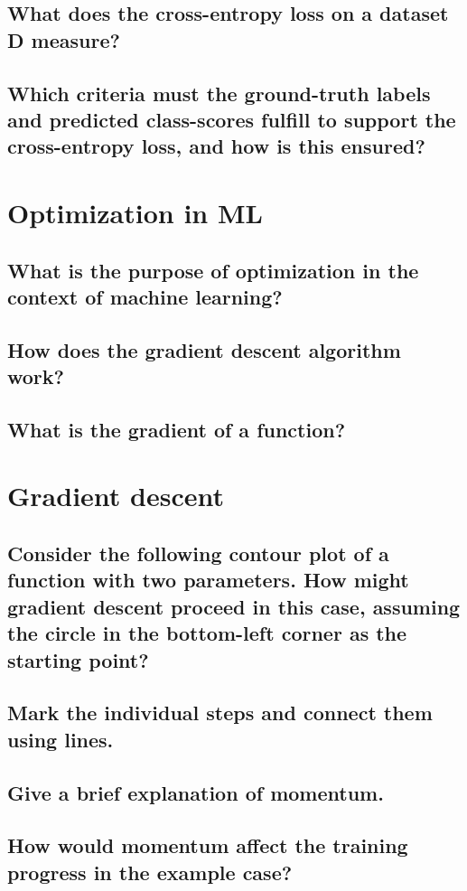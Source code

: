 \subsection{What does the cross-entropy loss on a dataset D measure?}
\subsection{Which criteria must the ground-truth labels and predicted class-scores fulfill to support the cross-entropy loss, and how is this ensured?}

\section{Optimization in ML}
\subsection{What is the purpose of optimization in the context of machine learning?}
\subsection{How does the gradient descent algorithm work?}
\subsection{What is the gradient of a function? }


\section{Gradient descent}
\subsection{Consider the following contour plot of a function with two parameters. How might gradient descent proceed in this case, assuming the circle in the bottom-left corner as the starting point?}
\subsection{Mark the individual steps and connect them using lines.}
\subsection{Give a brief explanation of momentum.}
\subsection{How would momentum affect the training progress in the example case?}
